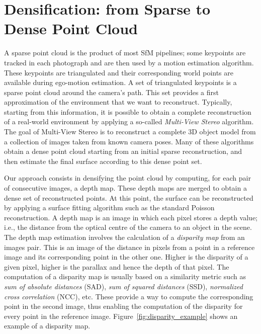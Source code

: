 \section{Densification: from Sparse to Dense Point Cloud}
A sparse point cloud is the product of most SfM pipelines; some keypoints are tracked in each photograph and are then used by a motion estimation algorithm. These keypoints are triangulated and their corresponding world points are available during ego-motion estimation.
%
A set of triangulated keypoints is a sparse point cloud around the camera's path. This set provides a first approximation of the environment that we want to reconstruct.
Typically, starting from this information, it is possible to obtain a complete reconstruction of a real-world environment by applying
a so-called \emph{Multi-View Stereo} algorithm. The goal of Multi-View Stereo\cite{seitz2006comparison} is to reconstruct a complete
3D object model from a collection of images taken from known camera poses.
Many of these algorithms obtain a dense point cloud starting from an initial sparse reconstruction, and then estimate the final surface according to this dense point set.

Our approach consists in densifying the point cloud by computing, for each pair of consecutive images, 
a depth map. These depth maps are merged to obtain a dense set of reconstructed points. At this point, the 
surface can be reconstructed by applying a surface fitting algorithm such as the standard Poisson reconstruction.
A depth map is an image in which each pixel stores a depth value; i.e., the distance from the optical centre of the camera to an object in the scene.
The depth map estimation involves the calculation of a \emph{disparity map} from an images pair. 
This is an image of the distance in pixels from a point in a reference image and its corresponding
point in the other one. Higher is the disparity of a given pixel, higher is the parallax and hence the depth of that pixel. 
%
The computation of a disparity map is usually based on a similarity metric such as 
\emph{sum of absolute distances} (SAD), \emph{sum of squared distances} (SSD), 
\emph{normalized cross correlation} (NCC), etc. 
These provide a way to compute the corresponding point in the second image, thus enabling the 
computation of the disparity for every point in the reference image.
Figure~\ref{fig:disparity_example} shows an example of a disparity map.

